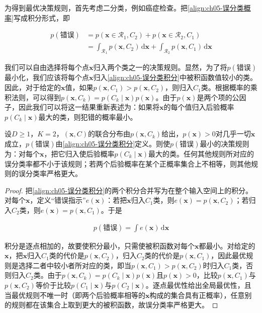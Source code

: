 \documentclass[../../main.tex]{subfiles}
\begin{document}
为得到最优决策规则，首先考虑二分类，例如癌症检查。把\eqref{align:ch05-误分类概率}写成积分形式，即

\begin{align}
  p(\text{错误})&=p(\boldsymbol{x}\in\mathcal{R}_1,C_2)+p(\boldsymbol{x}\in\mathcal{R}_2,C_1)\nonumber\\
  &=\int_{\mathcal{R}_1}p(\boldsymbol{x},C_2)\,\mathrm{d}\boldsymbol{x}+\int_{\mathcal{R}_2}p(\boldsymbol{x},C_1)\,\mathrm{d}\boldsymbol{x}
  \label{align:ch05-误分类积分}
\end{align}

我们可以自由选择将每个点$\boldsymbol{x}$归入两个类之一的决策规则。显然，为了将$p(\text{错误})$最小化，我们应该将每个点$\boldsymbol{x}$归入\eqref{align:ch05-误分类积分}中被积函数值较小的类。因此，对于给定的$\boldsymbol{x}$值，如果$p(\boldsymbol{x},C_1)>p(\boldsymbol{x},C_2)$，则归入$C_1$类。根据概率的乘积法则，可以得到$p(\boldsymbol{x},C_k)=p(C_k\mid\boldsymbol{x})p(\boldsymbol{x})$。由于$p(\boldsymbol{x})$是两个项的公因子，因此我们可以将这一结果重新表述为：如果将$\boldsymbol{x}$的每个值归入后验概率$p(C_k\mid\boldsymbol{x})$最大的类，则犯错的概率最小。

\begin{proposition}[最小误分类率规则]\label{proposition:ch05-误分类规则}
设$D\geqslant1$，$K=2$，$(\boldsymbol{x},C)$的联合分布由$p(\boldsymbol{x},C_k)$给出，$p(\boldsymbol{x})>0$对几乎一切$\boldsymbol{x}$成立，$p(\text{错误})$由\eqref{align:ch05-误分类积分}定义。则使$p(\text{错误})$最小的决策规则为：对每个$\boldsymbol{x}$，把它归入使后验概率$p(C_k\mid\boldsymbol{x})$最大的类。任何其他规则所对应的误分类率都不小于该规则；若两个后验概率在某个正概率集合上不相等，则其他规则的误分类率严格更大。
\end{proposition}

\begin{proof}
把\eqref{align:ch05-误分类积分}的两个积分合并写为在整个输入空间上的积分。对每个$\boldsymbol{x}$，定义“错误指示”$e(\boldsymbol{x})$：若把$\boldsymbol{x}$归入$C_1$类，则$e(\boldsymbol{x})=p(\boldsymbol{x},C_2)$；若归入$C_2$类，则$e(\boldsymbol{x})=p(\boldsymbol{x},C_1)$。于是

\begin{align}
  p(\text{错误})=\int e(\boldsymbol{x})\,\mathrm{d}\boldsymbol{x}
\end{align}

积分是逐点相加的，故要使积分最小，只需使被积函数对每个$\boldsymbol{x}$都最小。对给定的$\boldsymbol{x}$，把$\boldsymbol{x}$归入$C_1$类的代价是$p(\boldsymbol{x},C_2)$，归入$C_2$类的代价是$p(\boldsymbol{x},C_1)$，因此最优规则是选择二者中较小者所对应的类，即当$p(\boldsymbol{x},C_1)>p(\boldsymbol{x},C_2)$时归入$C_1$类，否则归入$C_2$类。由于$p(\boldsymbol{x},C_k)=p(C_k\mid\boldsymbol{x})p(\boldsymbol{x})$且$p(\boldsymbol{x})>0$，比较$p(\boldsymbol{x},C_1)$与$p(\boldsymbol{x},C_2)$等价于比较$p(C_1\mid\boldsymbol{x})$与$p(C_2\mid\boldsymbol{x})$。逐点最优性给出全局最优性，且当最优规则不唯一时（即两个后验概率相等的$\boldsymbol{x}$构成的集合具有正概率），任意别的规则都在该集合上取到更大的被积函数，故误分类率严格更大。
\end{proof}
\end{document}
